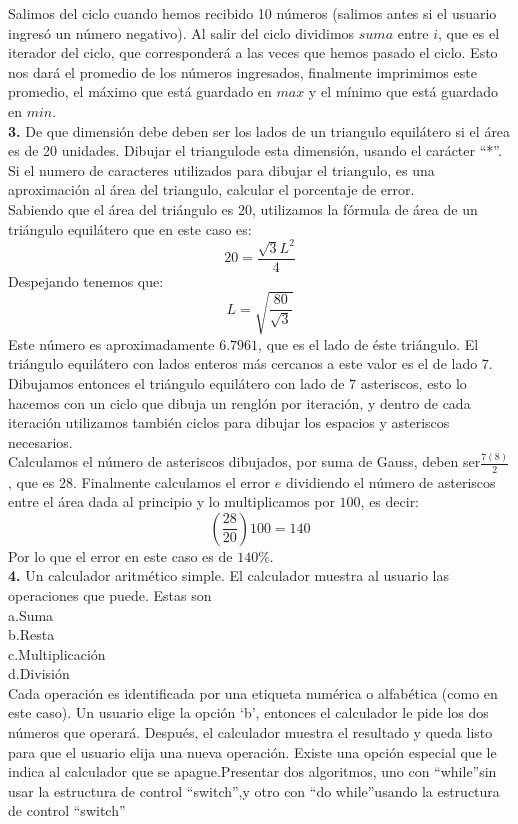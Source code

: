 \documentclass{article}
\begin{document}
Salimos del ciclo cuando hemos recibido 10 números (salimos antes si el usuario ingresó un número negativo). Al salir del ciclo dividimos $suma$ entre $i$, que es el iterador del ciclo, que corresponderá a las veces que hemos pasado el ciclo. Esto nos dará el promedio de los números ingresados, finalmente imprimimos este promedio, el máximo que está guardado en $max$ y el mínimo que está guardado en $min$.\\ 


\textbf{3.} De que dimensión debe deben ser los lados de un triangulo equilátero si el área es de 20 unidades. Dibujar el triangulode esta dimensión, usando el carácter “*”. Si el numero de caracteres utilizados para dibujar el triangulo, es una aproximación al área del triangulo, calcular el porcentaje de error.\\

Sabiendo que el área del triángulo es $20$, utilizamos la fórmula de área de un triángulo equilátero que en este caso es: \[ 20 = \frac{\sqrt{3}L^2}{4} \] Despejando tenemos que: \[ L = \sqrt{\frac{80}{\sqrt{3}}} \] Este número es aproximadamente $6.7961$, que es el lado de éste triángulo. El triángulo equilátero con lados enteros más cercanos a este valor es el de lado $7$. Dibujamos entonces el triángulo equilátero con lado de $7$ asteriscos, esto lo hacemos con un ciclo que dibuja un renglón por iteración, y dentro de cada iteración utilizamos también ciclos para dibujar los espacios y asteriscos necesarios.\\

Calculamos el número de asteriscos dibujados, por suma de Gauss, deben ser$\frac{7(8)}{2}$, que es $28$. Finalmente calculamos el error $e$ dividiendo el número de asteriscos entre el área dada al principio y lo multiplicamos por $100$, es decir: \[ (\frac{28}{20})100 = 140 \] Por lo que el error en este caso es de $140\%$.\\ 



\textbf{4.} Un calculador aritmético simple. El calculador muestra al usuario las operaciones que puede. Estas son\\
a.Suma\\
b.Resta\\
c.Multiplicación\\
d.División\\
Cada operación es identificada por una etiqueta numérica o alfabética (como en este caso). Un usuario elige la opción ‘b’, entonces el calculador le pide los dos números que operará. Después, el calculador muestra el resultado y queda listo para que el usuario elija una nueva operación. Existe una opción especial que le indica al calculador que se apague.Presentar dos algoritmos, uno con “while”sin usar la estructura de control “switch”,y otro con “do while”usando la estructura de control “switch”\\
\end{document}
